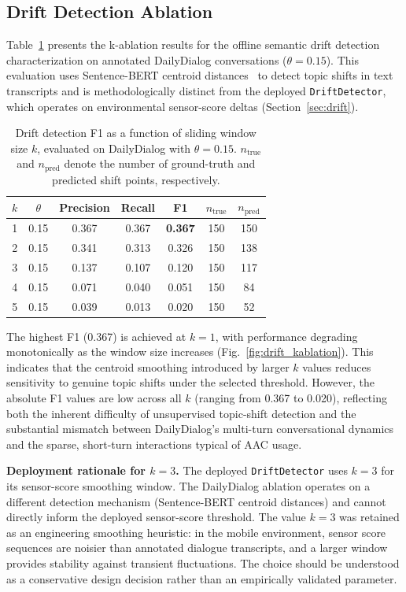 \documentclass[journal]{IEEEtran}
\begin{document}
\subsection{Drift Detection Ablation}
\label{sec:results_drift}

Table~\ref{tab:drift} presents the k-ablation results for the offline semantic drift detection characterization on annotated DailyDialog conversations ($\theta = 0.15$). This evaluation uses Sentence-BERT centroid distances~\cite{minilm} to detect topic shifts in text transcripts and is methodologically distinct from the deployed \texttt{DriftDetector}, which operates on environmental sensor-score deltas (Section~\ref{sec:drift}).

\begin{table}[htbp]
\centering
\caption{Drift detection F1 as a function of sliding window size $k$, evaluated on DailyDialog with $\theta = 0.15$. $n_{\text{true}}$ and $n_{\text{pred}}$ denote the number of ground-truth and predicted shift points, respectively.}
\label{tab:drift}
\begin{tabular}{ccccccc}
\hline
$k$ & $\theta$ & Precision & Recall & F1 & $n_{\text{true}}$ & $n_{\text{pred}}$ \\
\hline
1 & 0.15 & 0.367 & 0.367 & \textbf{0.367} & 150 & 150 \\
2 & 0.15 & 0.341 & 0.313 & 0.326 & 150 & 138 \\
3 & 0.15 & 0.137 & 0.107 & 0.120 & 150 & 117 \\
4 & 0.15 & 0.071 & 0.040 & 0.051 & 150 & 84 \\
5 & 0.15 & 0.039 & 0.013 & 0.020 & 150 & 52 \\
\hline
\end{tabular}
\end{table}

The highest F1 (0.367) is achieved at $k = 1$, with performance degrading monotonically as the window size increases (Fig.~\ref{fig:drift_kablation}). This indicates that the centroid smoothing introduced by larger $k$ values reduces sensitivity to genuine topic shifts under the selected threshold. However, the absolute F1 values are low across all $k$ (ranging from 0.367 to 0.020), reflecting both the inherent difficulty of unsupervised topic-shift detection and the substantial mismatch between DailyDialog's multi-turn conversational dynamics and the sparse, short-turn interactions typical of AAC usage.

\textbf{Deployment rationale for $k = 3$.} The deployed \texttt{DriftDetector} uses $k = 3$ for its sensor-score smoothing window. The DailyDialog ablation operates on a different detection mechanism (Sentence-BERT centroid distances) and cannot directly inform the deployed sensor-score threshold. The value $k = 3$ was retained as an engineering smoothing heuristic: in the mobile environment, sensor score sequences are noisier than annotated dialogue transcripts, and a larger window provides stability against transient fluctuations. The choice should be understood as a conservative design decision rather than an empirically validated parameter.
\end{document}
